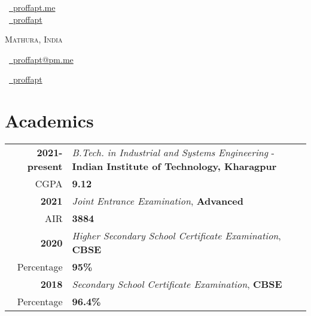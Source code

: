 \documentclass[a4paper,10pt]{extarticle} %
\begin{document}
\pagestyle{empty} %

\begin{multicols}{3}

\normalsize  \faGlobe\ {\href{https://proffapt.me/}{\  proffapt.me}}\\
\normalsize \faGithub\ {\href{https://github.com/proffapt}{\  proffapt}}\\
\columnbreak
\normalsize\par{\centering{\huge\textsc{\textcolor{primary}{Arpit Bhardwaj}}}\par} 
\par{\centering\normalsize {\textsc{Mathura, India}}\hfill\par}
\columnbreak
\raggedright\hfill\normalsize \faEnvelope\ {\href{mailto:proffapt@pm.me}{\  proffapt@pm.me}}\\
\raggedright\hfill\normalsize \faLinkedinSquare\ {\href{https://www.linkedin.com/in/proffapt}{\  proffapt}}\\
\end{multicols}
\vspace{-0.4 cm}

\section{\textcolor{primary}{Academics}}
\vspace{+0.1cm}

\begin{tabular}{r|p{17.5cm}}	

 \textbf{2021-present} & \textit{B.Tech. in Industrial and Systems Engineering} - \textbf{Indian Institute of Technology, Kharagpur}\\
 \hfill CGPA & \textbf{9.12}\\
 \textbf{2021} & \textit{Joint Entrance Examination}, \textbf{Advanced}\\
 \hfill AIR & \textbf{3884}\\
 \textbf{2020} & \textit{Higher Secondary School Certificate Examination}, \textbf{CBSE}\\
 \hfill Percentage & \textbf{95\%}\\
 \textbf{2018} & \textit{Secondary School Certificate Examination}, \textbf{CBSE}\\
 \hfill Percentage & \textbf{96.4\%} \\
 
\end{tabular}
\end{document}
